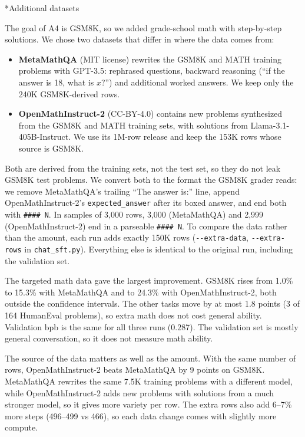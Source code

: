 \documentclass[11pt]{article}
\makeatletter
\renewcommand\subsection{\@startsection{subsection}{2}{\z@}{0.6em}{0.2em}{\normalsize\bfseries}}
\newcommand{\code}[1]{\texttt{#1}}
\newcommand{\ans}{\code{\#\#\#\#~N}}
\makeatother
\begin{document}
\subsection*{Additional datasets}

The goal of A4 is GSM8K, so we added grade-school math with step-by-step solutions. We chose two datasets that differ in where the data comes from:
\begin{itemize}[nosep]
  \item \textbf{MetaMathQA} \cite{metamath} (MIT license) rewrites the GSM8K and MATH training problems with GPT-3.5: rephrased questions, backward reasoning (``if the answer is 18, what is $x$?'') and additional worked answers. We keep only the 240K GSM8K-derived rows.
  \item \textbf{OpenMathInstruct-2} \cite{openmath2} (CC-BY-4.0) contains new problems synthesized from the GSM8K and MATH training sets, with solutions from Llama-3.1-405B-Instruct. We use its 1M-row release and keep the 153K rows whose source is GSM8K.
\end{itemize}
Both are derived from the training sets, not the test set, so they do not leak GSM8K test problems. We convert both to the format the GSM8K grader reads: we remove MetaMathQA's trailing ``The answer is:'' line, append OpenMathInstruct-2's \code{expected\_answer} after its boxed answer, and end both with \ans. In samples of 3,000 rows, 3,000 (MetaMathQA) and 2,999 (OpenMathInstruct-2) end in a parseable \ans. To compare the data rather than the amount, each run adds exactly 150K rows (\code{-{}-extra-data}, \code{-{}-extra-rows} in \code{chat\_sft.py}). Everything else is identical to the original run, including the validation set.

The targeted math data gave the largest improvement. GSM8K rises from 1.0\% to 15.3\% with MetaMathQA and to 24.3\% with OpenMathInstruct-2, both outside the confidence intervals. The other tasks move by at most 1.8 points (3 of 164 HumanEval problems), so extra math does not cost general ability. Validation bpb is the same for all three runs (0.287). The validation set is mostly general conversation, so it does not measure math ability.

The source of the data matters as well as the amount. With the same number of rows, OpenMathInstruct-2 beats MetaMathQA by 9 points on GSM8K. MetaMathQA rewrites the same 7.5K training problems with a different model, while OpenMathInstruct-2 adds new problems with solutions from a much stronger model, so it gives more variety per row. The extra rows also add 6--7\% more steps (496--499 vs 466), so each data change comes with slightly more compute.
\end{document}
